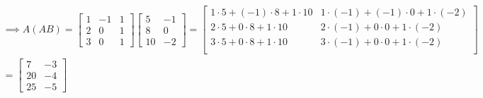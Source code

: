 \documentclass[a4paper, 11pt]{article}
\begin{document}
\begin{solution}
    \begin{multline*}
        \implies A(AB) =  \left[\begin{array}{ccc}
                1 & -1 & 1 \\
                2 & 0  & 1 \\
                3 & 0  & 1
            \end{array}\right]\left[\begin{array}{cc}
                5  & -1 \\
                8  & 0  \\
                10 & -2
            \end{array}\right]
        = \left[\begin{array}{cc}
                1 \cdot 5 + (-1) \cdot 8 + 1 \cdot 10 & 1 \cdot (-1) + (-1) \cdot 0 + 1 \cdot (-2) \\
                2 \cdot 5 + 0 \cdot 8 + 1 \cdot 10    & 2 \cdot (-1) + 0 \cdot 0 + 1 \cdot (-2)    \\
                3 \cdot 5 + 0 \cdot 8 + 1 \cdot 10    & 3 \cdot (-1) + 0 \cdot 0 + 1 \cdot (-2)    \\
            \end{array}\right]
        \\
        = \left[\begin{array}{cc}
                7  & -3 \\
                20 & -4 \\
                25 & -5
            \end{array}\right]
    \end{multline*}


\end{solution}
\end{document}

